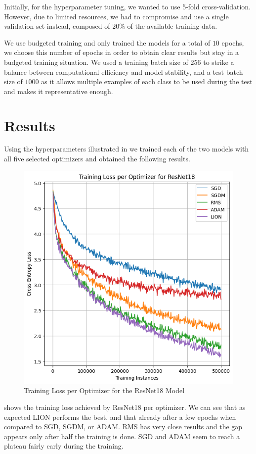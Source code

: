 \documentclass[10pt,conference,compsocconf]{IEEEtran}
\begin{document}
Initially, for the hyperparameter tuning, we wanted to use 5-fold cross-validation. However, due to limited resources, we had to compromise and use a single validation set instead, composed of $20$\% of the available training data.

We use budgeted training and only trained the models for a total of $10$ epochs, we choose this number of epochs in order to obtain clear results but stay in a budgeted training situation. We used a training batch size of $256$ to strike a balance between computational efficiency and model stability, and a test batch size of $1000$ as it allows multiple examples of each class to be used during the test and makes it representative enough.

\section{Results}
Using the hyperparameters illustrated in  we trained each of the two models with all five selected optimizers and obtained the following results.

\begin{figure}[htbp]
  \centering
  \includegraphics[width=0.8\columnwidth]{train_loss_18}
  \caption{Training Loss per Optimizer for the ResNet18 Model}
  \vspace{-3mm}
  \label{train_loss_18}
\end{figure}

 shows the training loss achieved by ResNet18 per optimizer. We can see that as expected LION performs the best, and that already after a few epochs when compared to SGD, SGDM, or ADAM. RMS has very close results and the gap appears only after half the training is done. SGD and ADAM seem to reach a plateau fairly early during the training.
\end{document}
